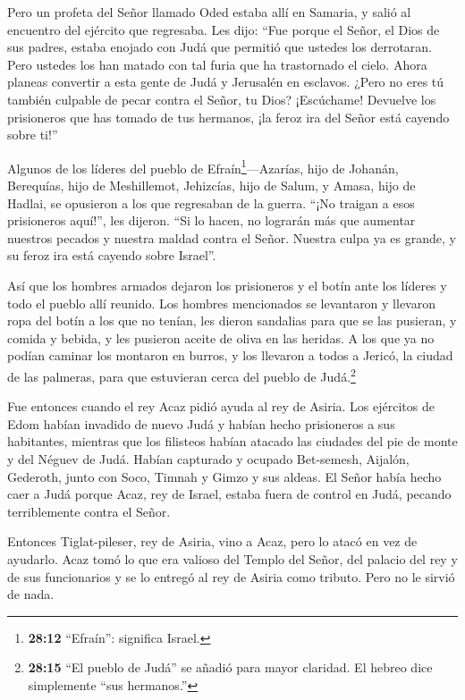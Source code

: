  Pero un profeta del Señor llamado Oded estaba allí en
Samaria, y salió al encuentro del ejército que regresaba. Les dijo:
``Fue porque el Señor, el Dios de sus padres, estaba enojado con Judá
que permitió que ustedes los derrotaran. Pero ustedes los han matado con
tal furia que ha trastornado el cielo.  Ahora planeas
convertir a esta gente de Judá y Jerusalén en esclavos. ¿Pero no eres tú
también culpable de pecar contra el Señor, tu Dios? 
¡Escúchame! Devuelve los prisioneros que has tomado de tus hermanos, ¡la
feroz ira del Señor está cayendo sobre ti!''

 Algunos de los líderes del pueblo de
Efraín\footnote{\textbf{28:12} ``Efraín'': significa Israel.}---Azarías,
hijo de Johanán, Berequías, hijo de Meshillemot, Jehizcías, hijo de
Salum, y Amasa, hijo de Hadlai, se opusieron a los que regresaban de la
guerra.  ``¡No traigan a esos prisioneros aquí!'', les
dijeron. ``Si lo hacen, no lograrán más que aumentar nuestros pecados y
nuestra maldad contra el Señor. Nuestra culpa ya es grande, y su feroz
ira está cayendo sobre Israel''.

 Así que los hombres armados dejaron los prisioneros y el
botín ante los líderes y todo el pueblo allí reunido.  Los
hombres mencionados se levantaron y llevaron ropa del botín a los que no
tenían, les dieron sandalias para que se las pusieran, y comida y
bebida, y les pusieron aceite de oliva en las heridas. A los que ya no
podían caminar los montaron en burros, y los llevaron a todos a Jericó,
la ciudad de las palmeras, para que estuvieran cerca del pueblo de
Judá.\footnote{\textbf{28:15} ``El pueblo de Judá'' se añadió para mayor
  claridad. El hebreo dice simplemente ``sus hermanos.''}

 Fue entonces cuando el rey Acaz pidió ayuda al rey de
Asiria.  Los ejércitos de Edom habían invadido de nuevo
Judá y habían hecho prisioneros a sus habitantes,  mientras
que los filisteos habían atacado las ciudades del pie de monte y del
Néguev de Judá. Habían capturado y ocupado Bet-semesh, Aijalón,
Gederoth, junto con Soco, Timnah y Gimzo y sus aldeas.  El
Señor había hecho caer a Judá porque Acaz, rey de Israel, estaba fuera
de control en Judá, pecando terriblemente contra el Señor.

 Entonces Tiglat-pileser, rey de Asiria, vino a Acaz, pero
lo atacó en vez de ayudarlo.  Acaz tomó lo que era valioso
del Templo del Señor, del palacio del rey y de sus funcionarios y se lo
entregó al rey de Asiria como tributo. Pero no le sirvió de nada.

